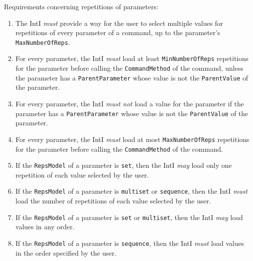 \documentclass[11pt]{article}
\newcommand{\must}{{\it must}}
\newcommand{\mustnot}{{\it must not}}
\newcommand{\may}{{\it may}}
\newcounter{coreReq}
\begin{document}
\noindent Requirements concerning repetitions of parameters:
\begin{enumerate}
\setcounter{enumi}{\value{coreReq}}

\item The IntI {\must} provide a way for the user to select
  multiple values for repetitions of every parameter of a command, up to
  the parameter's {\tt MaxNumberOfReps}.

\item For every parameter, the IntI {\must} load at least
  {\tt MinNumberOfReps} repetitions for the parameter before
  calling the {\tt CommandMethod} of the command, unless the
  parameter has a {\tt ParentParameter} whose value is not
  the {\tt ParentValue} of the parameter.

\item For every parameter, the IntI {\mustnot} load a value
  for the parameter if the parameter has a {\tt ParentParameter} whose
  value is not the {\tt ParentValue} of the parameter.

\item For every parameter, the IntI {\must} load at most
  {\tt MaxNumberOfReps} repetitions for the parameter before
  calling the {\tt CommandMethod} of the command.

\item If the {\tt RepsModel} of a parameter is {\tt set}, then
  the IntI {\may} load only one repetition of each value selected by the user.

\item If the {\tt RepsModel} of a parameter is {\tt multiset} or
  {\tt sequence}, then the IntI {\must} load the number of repetitions
  of each value selected by the user.

\item If the {\tt RepsModel} of a parameter is {\tt set} or
  {\tt multiset}, then the IntI {\may} load values in any order.

\item If the {\tt RepsModel} of a parameter is {\tt sequence},
  then the IntI {\must} load values in the order specified by
  the user.

\setcounter{coreReq}{\value{enumi}}
\end{enumerate}
\end{document}
